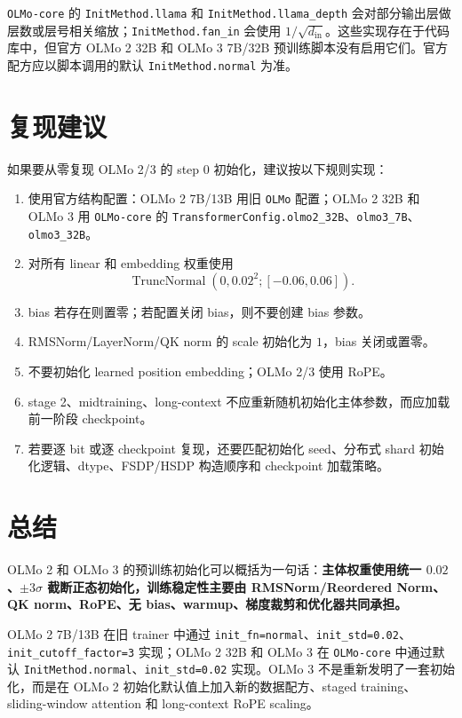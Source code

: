\documentclass[UTF8,a4paper,11pt]{ctexart}
\newcommand{\TruncNormal}{\operatorname{TruncNormal}}
\begin{document}
\texttt{OLMo-core} 的 \texttt{InitMethod.llama} 和 \texttt{InitMethod.llama\_depth} 会对部分输出层做层数或层号相关缩放；\texttt{InitMethod.fan\_in} 会使用 $1/\sqrt{d_{\mathrm{in}}}$。这些实现存在于代码库中，但官方 OLMo 2 32B 和 OLMo 3 7B/32B 预训练脚本没有启用它们。官方配方应以脚本调用的默认 \texttt{InitMethod.normal} 为准。

\section{复现建议}

如果要从零复现 OLMo 2/3 的 step 0 初始化，建议按以下规则实现：

\begin{enumerate}
  \item 使用官方结构配置：OLMo 2 7B/13B 用旧 \texttt{OLMo} 配置；OLMo 2 32B 和 OLMo 3 用 \texttt{OLMo-core} 的 \texttt{TransformerConfig.olmo2\_32B}、\texttt{olmo3\_7B}、\texttt{olmo3\_32B}。
  \item 对所有 linear 和 embedding 权重使用
  \[
    \TruncNormal(0,0.02^2;[-0.06,0.06]).
  \]
  \item bias 若存在则置零；若配置关闭 bias，则不要创建 bias 参数。
  \item RMSNorm/LayerNorm/QK norm 的 scale 初始化为 $1$，bias 关闭或置零。
  \item 不要初始化 learned position embedding；OLMo 2/3 使用 RoPE。
  \item stage 2、midtraining、long-context 不应重新随机初始化主体参数，而应加载前一阶段 checkpoint。
  \item 若要逐 bit 或逐 checkpoint 复现，还要匹配初始化 seed、分布式 shard 初始化逻辑、dtype、FSDP/HSDP 构造顺序和 checkpoint 加载策略。
\end{enumerate}

\section{总结}

OLMo 2 和 OLMo 3 的预训练初始化可以概括为一句话：\textbf{主体权重使用统一 $0.02$、$\pm3\sigma$ 截断正态初始化，训练稳定性主要由 RMSNorm/Reordered Norm、QK norm、RoPE、无 bias、warmup、梯度裁剪和优化器共同承担。}

OLMo 2 7B/13B 在旧 trainer 中通过 \texttt{init\_fn=normal}、\texttt{init\_std=0.02}、\texttt{init\_cutoff\_factor=3} 实现；OLMo 2 32B 和 OLMo 3 在 \texttt{OLMo-core} 中通过默认 \texttt{InitMethod.normal}、\texttt{init\_std=0.02} 实现。OLMo 3 不是重新发明了一套初始化，而是在 OLMo 2 初始化默认值上加入新的数据配方、staged training、sliding-window attention 和 long-context RoPE scaling。
\end{document}
